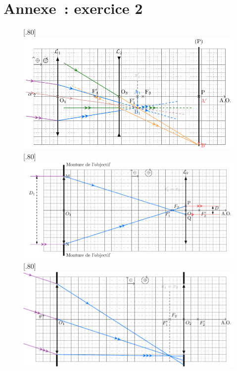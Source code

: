\documentclass[a4paper, 10pt, garamond, oneside]{book}
\begin{document}
{}{
	\newpage
	\chapter*{Annexe~: exercice 2}
	\begin{figure}[htbp!]
		\centering
		[.80\linewidth]
		{\includegraphics[width=\linewidth]{teleobj}}
		[.80\linewidth]
		{\includegraphics[width=\linewidth]{lunette2_corr}}
		[.80\linewidth]
		{\includegraphics[width=\linewidth]{lunette3_corr}}
		\caption{}
		\label{fig:lunettes_corr}
	\end{figure}

}
\end{document}
